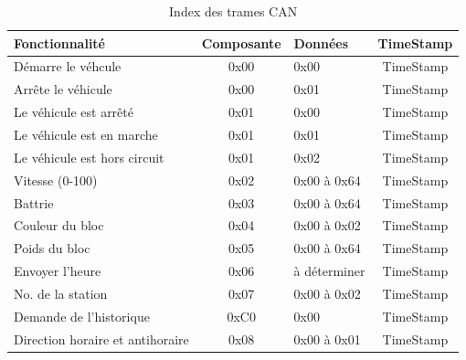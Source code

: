 \documentclass[10pt,a4paper,final]{article}
\begin{document}
\begin{spacing}{1.5}
\begin{table}[!ht]
\caption{Index des trames CAN}
\medskip
\centering
\begin{tabular}{|l|c|l|c|}
\hline 
\textbf{Fonctionnalité} & \textbf{Composante} & \textbf{Données} & \textbf{TimeStamp}\\
\hline 
Démarre le véhcule & 0x00 & 0x00 & TimeStamp\\ 
\hline 
Arrête le véhicule & 0x00 & 0x01 & TimeStamp\\ 
\hline 
Le véhicule est arrêté & 0x01 & 0x00 & TimeStamp\\ 
\hline 
Le véhicule est en marche& 0x01 & 0x01 & TimeStamp\\ 
\hline 
Le véhicule est hors circuit & 0x01 & 0x02 & TimeStamp\\ 
\hline 
Vitesse (0-100) & 0x02 & 0x00 à 0x64 & TimeStamp\\ 
\hline 
Battrie & 0x03 & 0x00 à 0x64 & TimeStamp\\ 
\hline 
Couleur du bloc & 0x04 & 0x00 à 0x02 & TimeStamp\\ 
\hline 
Poids du bloc & 0x05 & 0x00 à 0x64 & TimeStamp\\ 
\hline 
Envoyer l'heure & 0x06 & à déterminer  & TimeStamp\\ 
\hline 
No. de la station & 0x07 & 0x00 à 0x02 & TimeStamp\\ 
\hline 
Demande de l'historique & 0xC0 & 0x00 & TimeStamp\\ 
\hline 
Direction horaire et antihoraire & 0x08 & 0x00 à 0x01 & TimeStamp\\
\hline
\end{tabular} 
\label{tab:testtab1}
\end{table}


\end{spacing}
\end{document}
